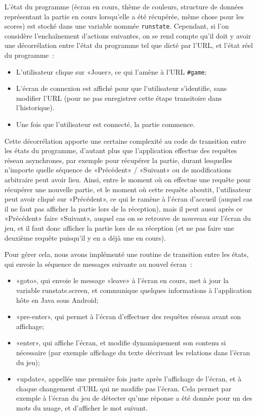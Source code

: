\documentclass[a4paper,11pt,french]{article}
\begin{document}
{L'état du programme (écran en cours, thème de couleurs, structure de données représentant la partie en cours lorsqu'elle a été récupérée,
même chose pour les scores) est stocké dans une variable nommée \verb!runstate!. Cependant, si l'on considère l'enchaînement d'actions
suivantes, on se rend compte qu'il doit y avoir une décorrélation entre l'état du programme tel que dicté par l'URL, et l'état réel du
programme~:
\begin{itemize}
\item L'utilisateur clique sur «Jouer», ce qui l'amène à l'URL \verb!#game!;
\item L'écran de connexion est affiché pour que l'utilisateur s'identifie, sans modifier l'URL (pour ne pas enregistrer cette étape
  transitoire dans l'historique).
\item Une fois que l'utilisateur est connecté, la partie commence.
\end{itemize}
Cette décorrélation apporte une certaine complexité au code de transition entre les états du programme, d'autant plus que l'application
effectue des requêtes réseau asynchrones, par exemple pour récupérer la partie, durant lesquelles n'importe quelle séquence de «Précédent» /
«Suivant» ou de modifications arbitraire peut avoir lieu. Ainsi, entre le moment où on effectue une requête pour récupérer une nouvelle
partie, et le moment où cette requête aboutit, l'utilisateur peut avoir cliqué sur «Précédent», ce qui le ramène à l'écran d'accueil (auquel
cas il ne faut pas afficher la partie lors de la réception), mais il peut aussi après ce «Précédent» faire «Suivant», auquel cas on se
retrouve de nouveau sur l'écran du jeu, et il faut donc afficher la partie lors de sa réception (et ne pas faire une deuxième requête
puisqu'il y en a déjà une en cours).

Pour gérer cela, nous avons implémenté une routine de transition entre les états, qui envoie la séquence de messages suivante au nouvel
écran~:
\begin{itemize}
\item «goto», qui envoie le message «leave» à l'écran en cours, met à jour la variable runstate.screen, et communique quelques informations
  à l'application hôte en Java sous Android;
\item «pre-enter», qui permet à l'écran d'effectuer des requêtes réseau avant son affichage;
\item «enter», qui affiche l'écran, et modifie dynamiquement son contenu si nécessaire (par exemple affichage du texte décrivant les
  relations dans l'écran du jeu);
\item «update», appellée une première fois juste après l'affichage de l'écran, et à chaque changement d'URL qui ne modifie pas l'écran. Cela
  permet par exemple à l'écran du jeu de détecter qu'une réponse a été donnée pour un des mots du nuage, et d'afficher le mot suivant.
\end{itemize}

}
\end{document}
